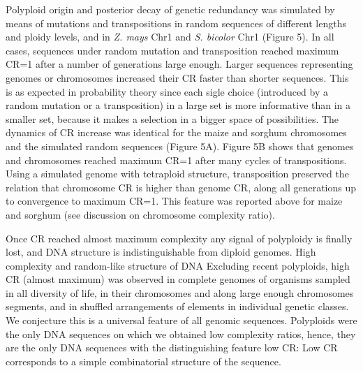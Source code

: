 Polyploid origin and posterior decay of genetic redundancy was simulated by means of mutations and transpositions in random sequences of different lengths and ploidy levels, and in \textit{Z. mays} Chr1 and \textit{S. bicolor} Chr1 (Figure 5). In all cases, sequences under random mutation and transposition reached maximum CR=1 after a number of generations large enough. Larger sequences representing genomes or chromosomes increased their CR faster than shorter sequences. This is as expected in probability theory since each sigle choice (introduced by a random mutation or a transposition) in a large set is more informative than in a smaller set, because it makes a selection in a bigger space of possibilities. The dynamics of CR increase was identical for the maize and sorghum chromosomes and the simulated random sequences (Figure 5A). Figure 5B shows that genomes and chromosomes reached maximum CR=1 after many cycles of transpositions. Using a simulated genome with tetraploid structure, transposition preserved the relation that chromosome CR is higher than genome CR, along all generations up to convergence to maximum CR=1. This feature was reported above for maize and sorghum (see discussion on chromosome complexity ratio).

Once CR reached almost maximum complexity any signal of polyploidy is finally lost, and DNA structure is indistinguishable from diploid genomes. High complexity and random-like structure of DNA Excluding recent polyploids, high CR (almost maximum) was observed in complete genomes of organisms sampled in all diversity of life, in their chromosomes and along large enough chromosomes segments, and in shuffled arrangements of elements in individual genetic classes. We conjecture this is a universal feature of all genomic sequences. Polyploids were the only DNA sequences on which we obtained low complexity ratios, hence, they are the only DNA sequences with the distinguishing feature low CR: Low CR corresponds to a simple combinatorial structure of the sequence. 

